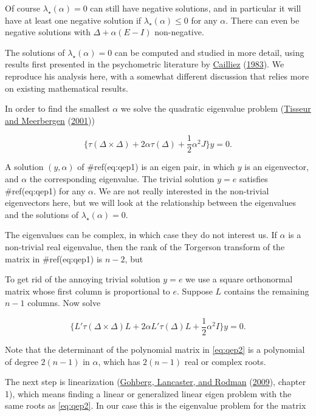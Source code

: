 \documentclass[
  12pt,
]{book}
\theoremstyle{definition}
\theoremstyle{definition}
\theoremstyle{definition}
\theoremstyle{definition}
\theoremstyle{remark}
\begin{document}
Of course \(\lambda_\star(\alpha)=0\) can still have negative solutions, and in particular it will have at least one negative solution if \(\lambda_\star(\alpha)\leq 0\) for any \(\alpha\). There can even be negative solutions with \(\Delta+\alpha(E-I)\) non-negative.

The solutions of \(\lambda_\star(\alpha)=0\) can be computed and studied in more detail, using results first presented in the psychometric literature by \protect\hyperlink{ref-cailliez_83}{Cailliez} (\protect\hyperlink{ref-cailliez_83}{1983}). We reproduce his analysis here, with a somewhat different discussion that relies more on existing mathematical results.

In order to find the smallest \(\alpha\) we solve the quadratic eigenvalue problem (\protect\hyperlink{ref-tisseur_meerbergen_01}{Tisseur and Meerbergen} (\protect\hyperlink{ref-tisseur_meerbergen_01}{2001}))

\begin{equation}
\{\tau(\Delta\times\Delta)+2\alpha\tau(\Delta)+\frac12\alpha^2J\}y=0.
\label{eq:qep1}
\end{equation}

A solution \((y,\alpha)\) of \#ref(eq:qep1) is an eigen pair, in which \(y\) is an eigenvector, and \(\alpha\) the corresponding eigenvalue. The trivial solution \(y=e\) satisfies \#ref(eq:qep1) for any \(\alpha\). We are not really interested in the non-trivial eigenvectors here, but we will look at the relationship between the eigenvalues and the solutions of \(\lambda_\star(\alpha)=0\).

The eigenvalues can be complex, in which case they do not interest us.
If \(\alpha\) is a non-trivial real eigenvalue, then the rank of the Torgerson transform of the matrix in \#ref(eq:qep1) is \(n-2\), but

To get rid of the annoying trivial solution \(y=e\) we use a square
orthonormal matrix whose first column is proportional to \(e\). Suppose
\(L\) contains the remaining \(n-1\) columns. Now solve

\begin{equation}
\{L'\tau(\Delta\times\Delta)L+2\alpha L'\tau(\Delta)L+\frac12\alpha^2I\}y=0.
\label{eq:qep2}
\end{equation}

Note that the determinant of the polynomial matrix in \eqref{eq:qep2} is
a polynomial of degree \(2(n-1)\) in \(\alpha\), which has \(2(n-1)\) real or
complex roots.

The next step is linearization (\protect\hyperlink{ref-gohberg_lancaster_rodman_09}{Gohberg, Lancaster, and Rodman} (\protect\hyperlink{ref-gohberg_lancaster_rodman_09}{2009}), chapter
1), which means finding a linear or generalized linear eigen problem with the
same roots as \eqref{eq:qep2}. In our case this is the eigenvalue problem for the matrix
\end{document}
